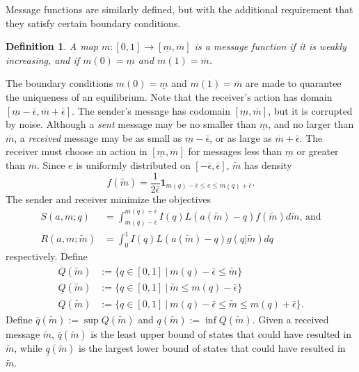 \documentclass[12pt]{article}
\newtheorem{definition}{Definition}
\begin{document}
\noindent Message functions are similarly defined, but with the additional requirement that they satisfy certain boundary conditions.
\begin{definition}
A map $m:[0,1]\rightarrow[\underline{m},\overline{m}]$ is a message function if it is weakly increasing, and if $m(0)=\underline{m}$ and $m(1)=\overline{m}$. 
\end{definition}
\noindent The boundary conditions $m(0)=\underline{m}$ and $m(1)=\overline{m}$ are made to quarantee the uniqueness of an equilibrium. Note that the receiver's action has domain $[\underline{m}-\bar{\epsilon},\overline{m}+\bar{\epsilon}]$. The sender's message has codomain $[\underline{m},\overline{m}]$, but it is corrupted by noise. Although a \textit{sent} message may be no smaller than $\underline{m}$, and no larger than $\overline{m}$, a \textit{received} message may be as small as $\underline{m}-\bar{\epsilon}$, or as large as $\overline{m}+\bar{\epsilon}$. The receiver must choose an action in $[\underline{m},\overline{m}]$ for messages less than $\underline{m}$ or greater than $\overline{m}$. Since $e$ is uniformly distributed on $[-\bar{\epsilon},\bar{\epsilon}]$, $\tilde{m}$ has density 
\begin{equation}
f(\tilde{m})=\frac{1}{2\bar{\epsilon}}\mathbf{1}_{m(q)-\bar{\epsilon}\leq e\leq m(q)+\bar{\epsilon}}.
\end{equation}
The sender and receiver minimize the objectives
\begin{align}
S(a,m;q)&=\int_{m(q)-\bar{\epsilon}}^{m(q)+\bar{\epsilon}}{I(q)L(a(\tilde{m})-q)f(\tilde{m})d\tilde{m}}\text{, and}\\
R(a,m;\tilde{m})&=\int_{0}^{1}{I(q)L(a(\tilde{m})-q)g(q|\tilde{m})dq}
\end{align}
respectively. Define
\begin{align}
\overline{Q}(\tilde{m})&:=\{q\in[0,1]\:|\:m(q)-\bar{\epsilon}\leq\tilde{m}\}\\
\underline{Q}(\tilde{m})&:=\{q\in[0,1]\:|\:\tilde{m}\leq m(q)-\bar{\epsilon}\}\\
Q(\tilde{m})&:=\{q\in[0,1]\:|\:m(q)-\bar{\epsilon}\leq\tilde{m}\leq m(q)+\bar{\epsilon}\}.
\end{align}
Define $\overline{q}(\tilde{m}):=\sup Q(\tilde{m})$ and $\underline{q}(\tilde{m}):=\inf Q(\tilde{m})$. Given a received message $\tilde{m}$, $\overline{q}(\tilde{m})$ is the least upper bound of states that could have resulted in $\tilde{m}$, while $\underline{q}(\tilde{m})$ is the largest lower bound of states that could have resulted in $\tilde{m}$.
\end{document}
